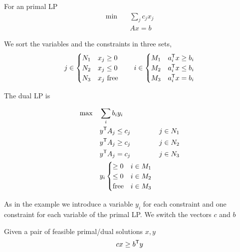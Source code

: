 \begin{Def}[Dual]\label{Def:dual} For an primal LP
\begin{align*}
\min \quad & \sum_j c_j x_j\\
\quad & Ax =b
\end{align*}

We sort the variables and the constraints in three sets, 
\[j \in \begin{cases}
N_1 & x_j\geq 0\\
N_2 & x_j\leq 0\\
N_3 & x_j \text{ free}
\end{cases} \qquad i\in \begin{cases}
M_1 & {a}^\text{\upshape \sffamily T}_ix \geq b_i\\
M_2 & {a}^\text{\upshape \sffamily T}_ix \leq b_i\\
M_3 & {a}^\text{\upshape \sffamily T}_ix = b_i
\end{cases}\]

The dual LP is

\begin{align*}
\max \quad & \sum_i b_iy_i\\
& {y}^\text{\upshape \sffamily T} A_j \leq c_j & j\in N_1\\
& {y}^\text{\upshape \sffamily T} A_j \geq c_j & j\in N_2\\
& {y}^\text{\upshape \sffamily T} A_j = c_j & j\in N_3\\
& y_i \begin{cases}
\geq 0 & i\in M_1\\
\leq 0 & i\in M_2\\
\text{free} & i\in M_3
\end{cases}
\end{align*}

As in the example we introduce a variable $y_i$ for each constraint and one constraint for each variable of the primal LP. We switch the vectors $c$ and $b$
\end{Def}

\begin{thm}\label{thm:weakDuality} Given a pair of feasible primal/dual solutions $x,y$
\[cx \geq  {b}^\text{\upshape \sffamily T} y\]
\end{thm}

